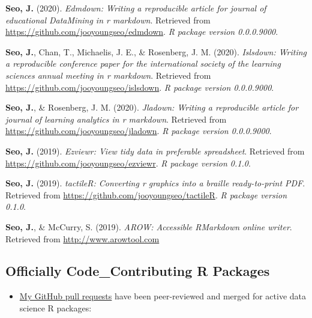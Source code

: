 \documentclass[11pt,a4paper,]{awesome-cv}
\providecommand{\tightlist}{%
	\setlength{\itemsep}{0pt}\setlength{\parskip}{0pt}}
\begin{document}
\hypertarget{refs_github_projects}{}
\leavevmode{}%
\textbf{Seo, J.} (2020). \emph{Edmdown: Writing a reproducible article
  for journal of educational DataMining in r markdown}. Retrieved from
\url{https://github.com/jooyoungseo/edmdown}. \emph{R package version
  0.0.0.9000}.

\leavevmode{}%
\textbf{Seo, J.}, Chan, T., Michaelis, J. E., \& Rosenberg, J. M.
(2020). \emph{Islsdown: Writing a reproducible conference paper for the
  international society of the learning sciences annual meeting in r
  markdown}. Retrieved from \url{https://github.com/jooyoungseo/islsdown}.
\emph{R package version 0.0.0.9000}.

\leavevmode{}%
\textbf{Seo, J.}, \& Rosenberg, J. M. (2020). \emph{Jladown: Writing a
  reproducible article for journal of learning analytics in r markdown}.
Retrieved from \url{https://github.com/jooyoungseo/jladown}. \emph{R
  package version 0.0.0.9000}.

\leavevmode{}%
\textbf{Seo, J.} (2019). \emph{Ezviewr: View tidy data in preferable
  spreadsheet}. Retrieved from
\url{https://github.com/jooyoungseo/ezviewr}. \emph{R package version
  0.1.0}.

\leavevmode{}%
\textbf{Seo, J.} (2019). \emph{tactileR: Converting r graphics into a
  braille ready-to-print PDF}. Retrieved from
\url{https://github.com/jooyoungseo/tactileR}. \emph{R package version
  0.1.0}.

\leavevmode{}%
\textbf{Seo, J.}, \& McCurry, S. (2019). \emph{AROW: Accessible
  RMarkdown online writer}. Retrieved from \url{http://www.arowtool.com}

\hypertarget{officially-code_contributing-r-packages}{%
  \subsection{Officially Code\_Contributing R
    Packages}\label{officially-code_contributing-r-packages}}

\begin{itemize}
  \tightlist
  \item
        \href{https://github.com/pulls?q=is\%3Apr+author\%3Ajooyoungseo+archived\%3Afalse+is\%3Aclosed}{My
          GitHub pull requests} have been peer-reviewed and merged for active
        data science R packages:
\end{itemize}
\end{document}
